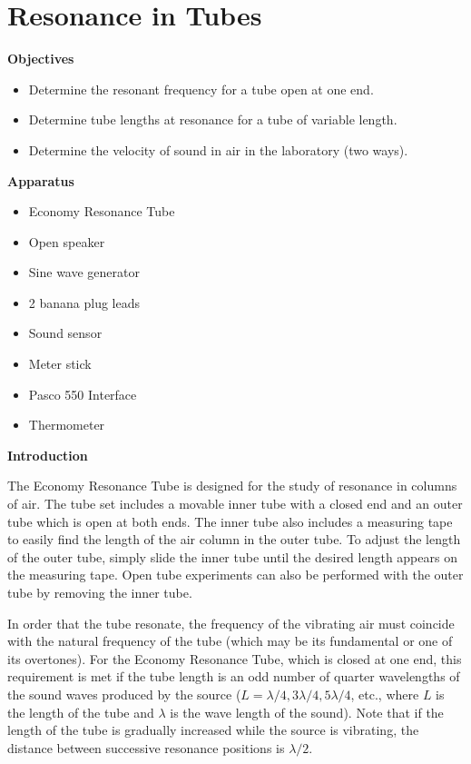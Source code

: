 \section{Resonance in Tubes}

\makelabheader %

\bigskip

\textbf{Objectives}
\begin{itemize}[nosep]
\item Determine the resonant frequency for a tube open at one end.

\item Determine tube lengths at resonance for a tube of variable length.

\item Determine the velocity of sound in air in the laboratory (two ways).

\end{itemize}

\bigskip
\textbf{Apparatus} 
\begin{itemize}[nosep]

\item Economy Resonance Tube 
\item Open speaker
\item Sine wave generator
\item 2 banana plug leads
\item Sound sensor
\item Meter stick
\item Pasco 550 Interface
\item Thermometer

\end{itemize}
\bigskip
\textbf{Introduction} 

The Economy Resonance Tube is designed for the study of resonance in columns of air.  The tube set includes a movable inner tube with a closed end and an outer tube which is open at both ends.  The inner tube also includes a measuring tape to easily find the length of the air column in the outer tube.  To adjust the length of the outer tube, simply slide the inner tube until the desired length appears on the measuring tape.  Open tube experiments can also be performed with the outer tube by removing the inner tube.

In order that the tube resonate, the frequency of the vibrating air must coincide with the natural frequency of the tube (which may be its fundamental or one of its overtones). For the Economy Resonance Tube, which is closed at one end, this requirement is met if the tube length is an odd number of quarter wavelengths of the sound waves produced by the source ($L = \lambda/4, 3 \lambda/4, 5 \lambda/4$, etc., where $L$ is the length of the tube and $\lambda$ is the wave length of the sound). Note that if the length of the tube is gradually increased while the source is vibrating, the distance between successive resonance positions is $\lambda/2$. 

